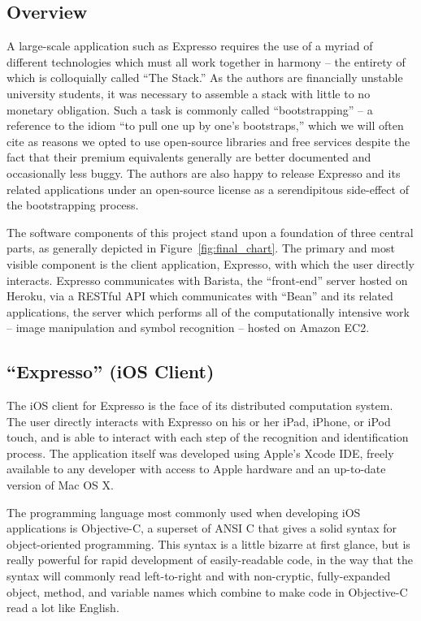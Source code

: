\documentclass{acm_proc_article-sp}
\begin{document}
\subsection{Overview}
A large-scale application such as Expresso requires the use of a myriad of different technologies which must all work together in harmony --
the entirety of which is colloquially called ``The Stack.'' As the authors are financially unstable university students, it was necessary to
assemble a stack with little to no monetary obligation. Such a task is commonly called ``bootstrapping'' -- a reference to the idiom ``to pull one up by one's bootstraps,'' which we will often cite as reasons we opted to use open-source libraries and free services despite the fact that their premium equivalents generally are better documented and occasionally less buggy. The authors are also happy to release Expresso and its related applications under an open-source license as a serendipitous side-effect of the bootstrapping process.

The software components of this project stand upon a foundation of three central parts, as generally depicted in Figure~\ref{fig:final_chart}. The primary and most visible component is the client application, Expresso, with which the user directly interacts. Expresso communicates with Barista, the ``front-end'' server hosted on Heroku, via a RESTful API which communicates with ``Bean'' and its related applications, the server which performs all of the computationally intensive work -- image manipulation and symbol recognition -- hosted on Amazon EC2.

\subsection{``Expresso'' (iOS Client)}
The iOS client for Expresso is the face of its distributed computation system. The user directly interacts with Expresso on his or her iPad, iPhone, or iPod touch, and is able to interact with each step of the recognition and identification process. The application itself was developed using Apple's Xcode IDE, freely available to any developer with access to Apple hardware and an up-to-date version of Mac OS X.

The programming language most commonly used when developing iOS applications is Objective-C, a superset of ANSI C that gives a solid syntax for object-oriented programming. This syntax is a little bizarre at first glance, but is really powerful for rapid development of easily-readable code, in the way that the syntax will commonly read left-to-right and with non-cryptic, fully-expanded object, method, and variable names which combine to make code in Objective-C read a lot like English.
\end{document}
